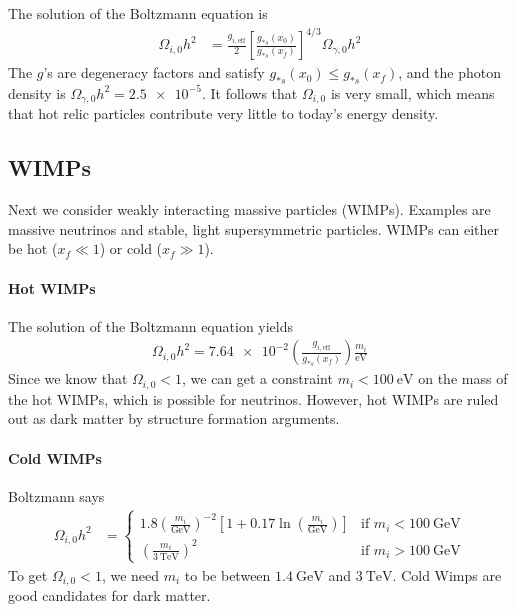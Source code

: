 The solution of the Boltzmann equation is
	\begin{align*}
		\Omega_{i,0} h^2
		&= \frac{ g_{i,\text{eff}} }{2}  \left[ \frac{g_{*s}(x_0)}{g_{*s}(x_f)} \right]^{4/3} \Omega_{\gamma, 0} h^2
	\end{align*}
The $g$'s are degeneracy factors and satisfy $g_{*s}(x_0) \leq g_{*s}(x_f)$, and the photon density is $\Omega_{\gamma,0} h^2 = \num{2.5e-5}$. It follows that $\Omega_{i,0}$ is very small, which means that hot relic particles contribute very little to today's energy density.

\subsection{WIMPs}
Next we consider weakly interacting massive particles (WIMPs). Examples are massive neutrinos and stable, light supersymmetric particles. WIMPs can either be hot ($x_f \ll 1$) or cold ($x_f \gg 1$).

\paragraph*{Hot WIMPs}
The solution of the Boltzmann equation yields
\begin{align*}
	\Omega_{i,0} h^2 = \num{7.64e-2} 
	\left( \frac{g_{i,\text{eff}}}{g_{*s}(x_f)} \right)
	\frac{m_i}{\si{\eV}}
\end{align*}
Since we know that $\Omega_{i,0} < 1$, we can get a constraint $m_i < \SI{100}{\eV}$ on the mass of the hot WIMPs, which is possible for neutrinos. However, hot WIMPs are ruled out as dark matter by structure formation arguments.

\paragraph*{Cold WIMPs}
Boltzmann says
\begin{align*}
	\Omega_{i,0} h^2
	&= \begin{cases}
	1.8 \left( \frac{m_i}{\si{\GeV}} \right)^{-2} 
	\left[ 1 + 0.17 \ln\left( \frac{m_i}{\si{\GeV}} \right) \right]
	& \text{if } m_i < \SI{100}{\GeV}\\
	\left( \frac{m_i}{\SI{3}{\TeV}} \right)^2
	& \text{if } m_i > \SI{100}{\GeV}
	\end{cases}
\end{align*}
To get $\Omega_{i,0} < 1$, we need $m_i$ to be between $\SI{1.4}{\GeV}$ and $\SI{3}{\TeV}$. Cold Wimps are good candidates for dark matter.

